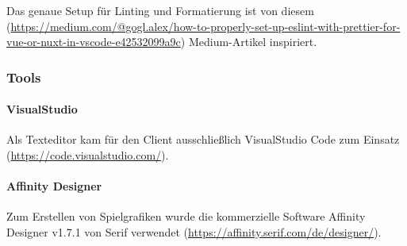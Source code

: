 	

Das genaue Setup für Linting und Formatierung ist von diesem (\url{https://medium.com/@gogl.alex/how-to-properly-set-up-eslint-with-prettier-for-vue-or-nuxt-in-vscode-e42532099a9c}) Medium-Artikel inspiriert.


\subsubsection{Tools}

	\paragraph{VisualStudio}
Als Texteditor kam für den Client ausschließlich VisualStudio Code zum Einsatz (\url{https://code.visualstudio.com/}).

	\paragraph{Affinity Designer}
Zum Erstellen von Spielgrafiken wurde die kommerzielle Software Affinity Designer v1.7.1 von Serif verwendet (\url{https://affinity.serif.com/de/designer/}).




